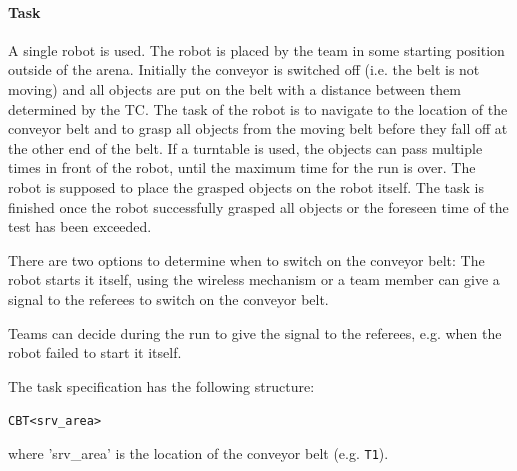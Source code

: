 \paragraph{Task}
A single robot is used. The robot is placed by the team in some starting position outside of the arena. Initially the conveyor is switched off (i.e. the belt is not moving) and all objects are put on the belt with a distance between them determined by the TC. The task of the robot is to navigate to the location of the conveyor belt and to grasp all objects from the moving belt before they fall off at the other end of the belt. If a turntable is used, the objects can pass multiple times in front of the robot, until the maximum time for the run is over. The robot is supposed to place the grasped objects on the robot itself. The task is finished once the robot successfully grasped all objects or the foreseen time of the test has been exceeded. 
\par
There are two options to determine when to switch on the conveyor belt:
The robot starts it itself, using the wireless mechanism or a team member can give a signal to the referees to switch on the conveyor belt.
\par
Teams can decide during the run to give the signal to the referees, e.g. when the robot failed to start it itself. 
\par
The task specification has the following structure:
\par
\begin{center}
\texttt{CBT\textless srv\_area\textgreater}
\end{center}
\par
where 'srv\_area' is the location of the conveyor belt (e.g. \texttt{T1}).



%



